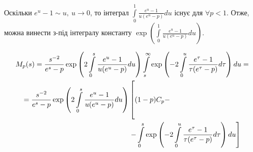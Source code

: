 Оскільки $e^u - 1 \sim u,~u \rightarrow 0$, то інтеграл $\int\limits_{0}^{1} \frac{e^u -1}{u(e^u - p)} du$ існує для $\forall p < 1$. Отже, можна винести з-під інтегралу константу $\exp\left(\int\limits_{0}^{1} \frac{e^u -1}{u(e^u - p)} du\right)$.

\begin{gather*}
M_{p}(s) = \frac{s^{-2}}{e^s-p} \exp \left(2 \int\limits_{0}^{s} \frac{e^u -1}{u(e^u - p)} du\right) \int\limits_s^\infty \exp\left(-2 \int\limits_{0}^{u} \frac{e^\tau -1}{\tau(e^\tau - p)} d\tau\right) du = \\
\begin{align*}
=\frac{s^{-2}}{e^s-p} \exp \left(2 \int\limits_{0}^{s} \frac{e^u -1}{u(e^u - p)} du\right) & \left[\rule{0cm}{1.05cm} (1-p) C_{p} - \right. \\
& \left.- \int\limits_0^s \exp\left(-2 \int\limits_{0}^{u} \frac{e^\tau -1}{\tau(e^\tau - p)} d\tau\right) du \right]
\end{align*}
\end{gather*}

